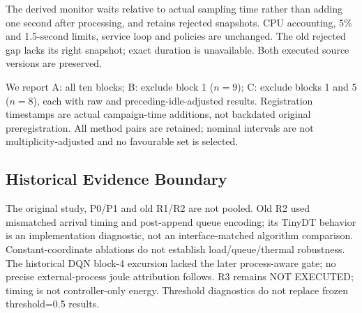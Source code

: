 The derived monitor waits relative to actual sampling time rather than adding one second after processing, and retains rejected snapshots. CPU accounting, 5\% and 1.5-second limits, service loop and policies are unchanged. The old rejected gap lacks its right snapshot; exact duration is unavailable. Both executed source versions are preserved.

We report A: all ten blocks; B: exclude block 1 ($n=9$); C: exclude blocks 1 and 5 ($n=8$), each with raw and preceding-idle-adjusted results. Registration timestamps are actual campaign-time additions, not backdated original preregistration. All method pairs are retained; nominal intervals are not multiplicity-adjusted and no favourable set is selected.

\subsection{Historical Evidence Boundary}
The original study, P0/P1 and old R1/R2 are not pooled. Old R2 used mismatched arrival timing and post-append queue encoding; its TinyDT behavior is an implementation diagnostic, not an interface-matched algorithm comparison. Constant-coordinate ablations do not establish load/queue/thermal robustness. The historical DQN block-4 excursion lacked the later process-aware gate; no precise external-process joule attribution follows. R3 remains NOT EXECUTED; timing is not controller-only energy. Threshold diagnostics do not replace frozen threshold=0.5 results.
